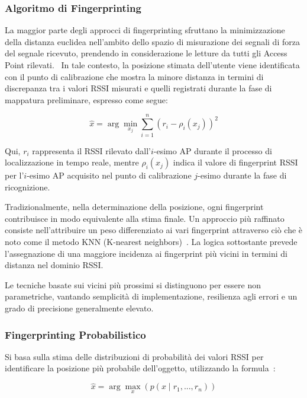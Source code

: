 \subsubsection{Algoritmo di Fingerprinting}
\hspace{\parindent}La maggior parte degli approcci di fingerprinting sfruttano la minimizzazione della distanza euclidea nell'ambito dello spazio di misurazione dei segnali di forza del segnale ricevuto, prendendo in considerazione le letture da tutti gli Access Point rilevati.~\cite{Seco2009} In tale contesto, la posizione stimata dell'utente viene identificata con il punto di calibrazione che mostra la minore distanza in termini di discrepanza tra i valori RSSI misurati e quelli registrati durante la fase di mappatura preliminare, espresso come segue:

\begin{equation}
    \hat{x} = \arg\min_{x_j} \sum_{i=1}^{n} (r_i - \rho_i(x_j))^2
\end{equation}

\noindent Qui, $r_i$ rappresenta il RSSI rilevato dall'$i$-esimo AP durante il processo di localizzazione in tempo reale, mentre $\rho_i(x_j)$ indica il valore di fingerprint RSSI per l'$i$-esimo AP acquisito nel punto di calibrazione $j$-esimo durante la fase di ricognizione.

Tradizionalmente, nella determinazione della posizione, ogni fingerprint contribuisce in modo equivalente alla stima finale. Un approccio più raffinato consiste nell'attribuire un peso differenziato ai vari fingerprint attraverso ciò che è noto come il metodo KNN (K-nearest neighbors)~\cite{Honkavirta2009}. La logica sottostante prevede l'assegnazione di una maggiore incidenza ai fingerprint più vicini in termini di distanza nel dominio RSSI.

Le tecniche basate sui vicini più prossimi si distinguono per essere non parametriche, vantando semplicità di implementazione, resilienza agli errori e un grado di precisione generalmente elevato.

\subsubsection{Fingerprinting Probabilistico}
\hspace{\parindent}Si basa sulla stima delle distribuzioni di probabilità dei valori RSSI per identificare la posizione più probabile dell'oggetto, utilizzando la formula~\cite{Seco2009}:

\begin{equation}
    \hat{x} = \arg\max_x (p(x \mid r_1, ..., r_n))
\end{equation}

